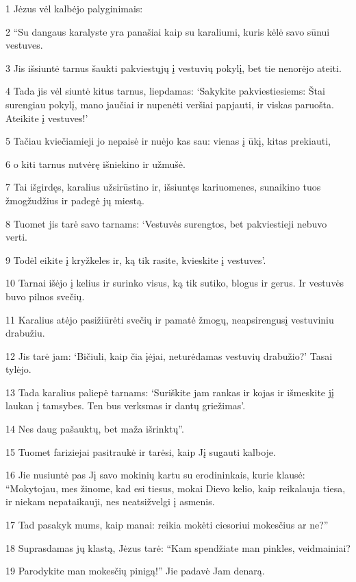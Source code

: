 \par 1 Jėzus vėl kalbėjo palyginimais: 
\par 2 “Su dangaus karalyste yra panašiai kaip su karaliumi, kuris kėlė savo sūnui vestuves. 
\par 3 Jis išsiuntė tarnus šaukti pakviestųjų į vestuvių pokylį, bet tie nenorėjo ateiti. 
\par 4 Tada jis vėl siuntė kitus tarnus, liepdamas: ‘Sakykite pakviestiesiems: Štai surengiau pokylį, mano jaučiai ir nupenėti veršiai papjauti, ir viskas paruošta. Ateikite į vestuves!’ 
\par 5 Tačiau kviečiamieji jo nepaisė ir nuėjo kas sau: vienas į ūkį, kitas prekiauti, 
\par 6 o kiti tarnus nutvėrę išniekino ir užmušė. 
\par 7 Tai išgirdęs, karalius užsirūstino ir, išsiuntęs kariuomenes, sunaikino tuos žmogžudžius ir padegė jų miestą. 
\par 8 Tuomet jis tarė savo tarnams: ‘Vestuvės surengtos, bet pakviestieji nebuvo verti. 
\par 9 Todėl eikite į kryžkeles ir, ką tik rasite, kvieskite į vestuves’. 
\par 10 Tarnai išėjo į kelius ir surinko visus, ką tik sutiko, blogus ir gerus. Ir vestuvės buvo pilnos svečių. 
\par 11 Karalius atėjo pasižiūrėti svečių ir pamatė žmogų, neapsirengusį vestuviniu drabužiu. 
\par 12 Jis tarė jam: ‘Bičiuli, kaip čia įėjai, neturėdamas vestuvių drabužio?’ Tasai tylėjo. 
\par 13 Tada karalius paliepė tarnams: ‘Suriškite jam rankas ir kojas ir išmeskite jį laukan į tamsybes. Ten bus verksmas ir dantų griežimas’. 
\par 14 Nes daug pašauktų, bet maža išrinktų”. 
\par 15 Tuomet fariziejai pasitraukė ir tarėsi, kaip Jį sugauti kalboje. 
\par 16 Jie nusiuntė pas Jį savo mokinių kartu su erodininkais, kurie klausė: “Mokytojau, mes žinome, kad esi tiesus, mokai Dievo kelio, kaip reikalauja tiesa, ir niekam nepataikauji, nes neatsižvelgi į asmenis. 
\par 17 Tad pasakyk mums, kaip manai: reikia mokėti ciesoriui mokesčius ar ne?” 
\par 18 Suprasdamas jų klastą, Jėzus tarė: “Kam spendžiate man pinkles, veidmainiai? 
\par 19 Parodykite man mokesčių pinigą!” Jie padavė Jam denarą. 
